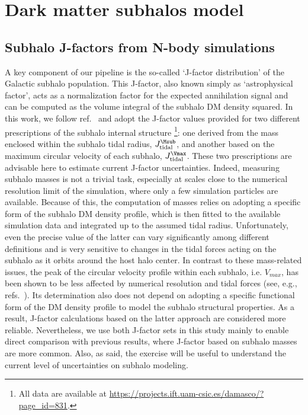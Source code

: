 \section{Dark matter subhalos model}
\label{sec:DM_model_chapter}

\subsection{Subhalo J-factors from N-body simulations}
\label{sec:sim-jfactor}
A key component of our pipeline is the so-called ‘J-factor distribution’ of the Galactic subhalo population. This J-factor, also known simply as ‘astrophysical factor’, acts as a normalization factor for the expected annihilation signal and can be computed as the volume integral of the subhalo DM density squared. In this work, we follow ref.~\cite{2024MNRAS.530.2496A} and adopt the J-factor values provided for two different prescriptions of the subhalo internal structure%
\footnote{All data are available at \url{https://projects.ift.uam-csic.es/damasco/?page_id=831}.}: one derived from the mass enclosed within the subhalo tidal radius, $J_\textrm{tidal}^{\Msub}$, and another based on the maximum circular velocity of each subhalo, $J_\textrm{tidal}^{\Vmax}$. 
These two prescriptions are advisable here to estimate current J-factor uncertainties. 
Indeed, measuring subhalo masses is not a trivial task, especially at scales close to the numerical resolution limit of the simulation, where only a few simulation particles are available. Because of this, the computation of masses relies on adopting a specific form of the subhalo DM density profile, which is then fitted to the available simulation data and integrated up to the assumed tidal radius. Unfortunately, even the precise value of the latter can vary significantly among different definitions and is very sensitive to changes in the tidal forces acting on the subhalo as it orbits around the host halo center. In contrast to these mass-related issues, the peak of the circular velocity profile within each subhalo, i.e. $V_{max}$, has been shown to be less affected by numerical resolution and tidal forces (see, e.g., refs.~\cite{2024MNRAS.530.2496A,2025arXiv250601152A}). Its determination also does not depend on adopting a specific functional form of the DM density profile to model the subhalo structural properties. As a result, J-factor calculations based on the latter approach are considered more reliable. Nevertheless, we use both J-factor sets in this study mainly to enable direct comparison with previous results, where J-factor based on subhalo masses are more common. Also, as said, the exercise will  be useful to understand the current level of uncertainties on subhalo modeling.

